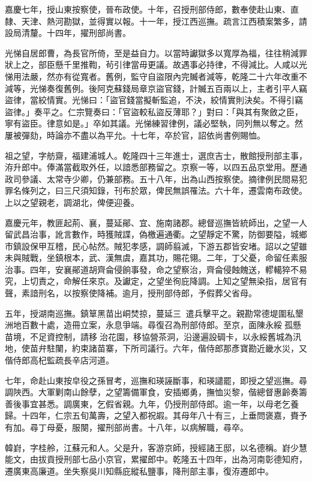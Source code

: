 \begin{pinyinscope}
嘉慶七年，授山東按察使，晉布政使。十年，召授刑部侍郎，數奉使赴山東、直隸、天津、熱河勘獄，並得實以報。十一年，授江西巡撫。疏言江西積案繁多，請設局清釐。十四年，擢刑部尚書。

光悌自居郎曹，為長官所倚，至是益自力。以當時讞獄多以寬厚為福，往往稍減罪狀上之，部臣懸千里推鞫，茍引律當毋更議。故遇事必持律，不得減比。人咸以光悌用法嚴，然亦有從寬者。舊例，監守自盜限內完贓者減等，乾隆二十六年改重不減等，光悌奏復舊例。後阿克蘇錢局章京盜官錢，計贓五百兩以上，主者引平人竊盜律，當絞情實。光悌曰：「盜官錢當擬斬監追，不決，絞情實則決矣。不得引竊盜律。」奏平之。仁宗覽奏曰：「官盜較私盜反薄耶？」對曰：「與其有聚斂之臣，寧有盜臣。律意如是。」卒如其議。光悌練習律例，議必堅執，同列無以奪之。然屢被彈劾，時論亦不盡以為平允。十七年，卒於官，詔依尚書例賜恤。

祖之望，字舫齋，福建浦城人。乾隆四十三年進士，選庶吉士，散館授刑部主事，洊升郎中。俸滿當截取外任，以諳悉部務留之。京察一等，以四五品京堂用。歷通政司參議、太常寺少卿，仍兼部務。五十八年，出為山西按察使。摘律例民間易犯罪名條列之，曰三尺須知錄，刊布於眾，俾民無誤罹法。六十年，遷雲南布政使。上以之望親老，調湖北，俾便迎養。

嘉慶元年，教匪起荊、襄，蔓延鄖、宜、施南諸郡。總督巡撫皆統師出，之望一人留武昌治事，訛言數作，時獲賊諜，偽檄遍通衢。之望靜定不驚，防御要隘，城鄉市鎮設保甲互稽，民心帖然。賊犯孝感，調師翦滅，下游五郡皆安堵。詔以之望雖未與賊戰，坐鎮根本，武、漢無虞，嘉其功，賜花翎。二年，丁父憂，命留任素服治事。四年，安襄鄖道胡齊侖侵餉事發，命之望察治，齊侖侵蝕餽送，轇轕猝不易究，上切責之，命解任來京。及讞定，之望坐徇庇降調。上知之望無染指，居官有聲，素諳刑名，以按察使降補。逾月，授刑部侍郎，予假葬父省母。

五年，授湖南巡撫。鎮筸黑苗出峒焚掠，蔓延三，遣兵擊平之。親勘常德堤圍私墾洲地百數十處，造冊立案，永息爭端。尋復召為刑部侍郎。至京，面陳永綏孤懸苗境，不足資控制，請移治花園，移協營茶洞，沿邊遍設碉卡，以永綏舊城為汛地，使苗弁駐闉，約束諸苗寨，下所司議行。六年，偕侍郎那彥寶勘近畿水災，又偕侍郎高杞監疏長辛店河道。

七年，命赴山東按皁役之孫冒考，巡撫和瑛誣斷事，和瑛譴罷，即授之望巡撫。尋調陜西。大軍剿南山餘孽，之望籌備軍食，安插鄉勇，撫恤災黎，偕總督惠齡奏籌善後事宜甚悉。調廣東，乞假省親。九年，仍授刑部侍郎。逾一年，以母老乞養歸。十四年，仁宗五旬萬壽，之望入都祝嘏。其母年八十有三，上垂問褒嘉，賚予有加。尋丁母憂，服闋，擢刑部尚書。十八年，以病解職，尋卒。

韓崶，字桂舲，江蘇元和人。父是升，客游京師，授經諸王邸，以名德稱。崶少慧能文，由拔貢授刑部七品小京官，累擢郎中。乾隆五十四年，出為河南彰德知府，遷廣東高廉道。坐失察吳川知縣庇縱私鹽事，降刑部主事，復洊遷郎中。


\end{pinyinscope}

